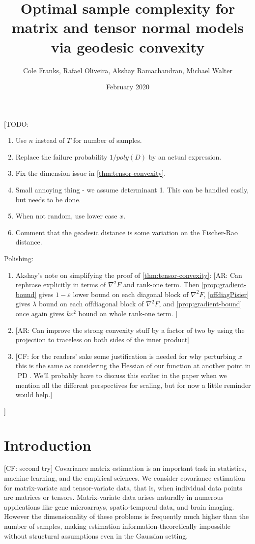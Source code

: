 \documentclass{article}
\title{Optimal sample complexity for matrix and tensor normal models via geodesic convexity}
\author{Cole Franks, Rafael Oliveira, Akshay Ramachandran, Michael Walter}
\date{February 2020}
\newcommand\eps{\varepsilon}
\newcommand\PD{\operatorname{PD}}
\newcommand\samp{x}
\newcommand{\CF}[1]{{\color{purple}[CF: #1]}}
\newcommand{\AR}[1]{{\color{orange}[AR: #1]}}
\newcommand{\TODO}[1]{{\color{blue}[TODO: #1]}}
\begin{document}
\maketitle
\tableofcontents
\TODO{
\begin{enumerate}
\item Use $n$ instead of $T$ for number of samples.
\item Replace the failure probability $1/poly(D)$ by an actual expression.
\item Fix the dimension issue in \cref{thm:tensor-convexity}.
\item Small annoying thing - we assume determinant 1. This can be handled easily, but needs to be done.
\item When not random, use lower case $x$.
\item Comment that the geodesic distance is some variation on the Fischer-Rao distance.
\end{enumerate}
Polishing:
\begin{enumerate}
\item Akshay's note on simplifying the proof of \cref{thm:tensor-convexity}: \AR{Can rephrase explicitly in terms of $\nabla^{2} F$ and rank-one term. Then \ref{prop:gradient-bound} gives $1-\eps$ lower bound on each diagonal block of $\nabla^{2} F$, \ref{offdiagPisier} gives $\lambda$ bound on each offdiagonal block of $\nabla^{2} F$, and \ref{prop:gradient-bound} once again gives $k \eps^{2}$ bound on whole rank-one term.  }
\item \AR{Can improve the strong convexity stuff by a factor of two by using the projection to traceless on both sides of the inner product}
\item \CF{for the readers' sake some justification is needed for why perturbing $\samp$ this is the same as considering the Hessian of our function at another point in $\PD$. We'll probably have to discuss this earlier in the paper when we mention all the different perspectives for scaling, but for now a little reminder would help.}
\end{enumerate}

}


\section{Introduction}
\CF{second try}
Covariance matrix estimation is an important task in statistics, machine learning, and the empirical sciences. We consider covariance estimation for matrix-variate and tensor-variate data, that is, when individual data points are matrices or tensors. Matrix-variate data arises naturally in numerous applications like gene microarrays, spatio-temporal data, and brain imaging. However the dimensionality of these problems is frequently much higher than the number of samples, making estimation information-theoretically impossible without structural assumptions even in the Gaussian setting. 
\end{document}
